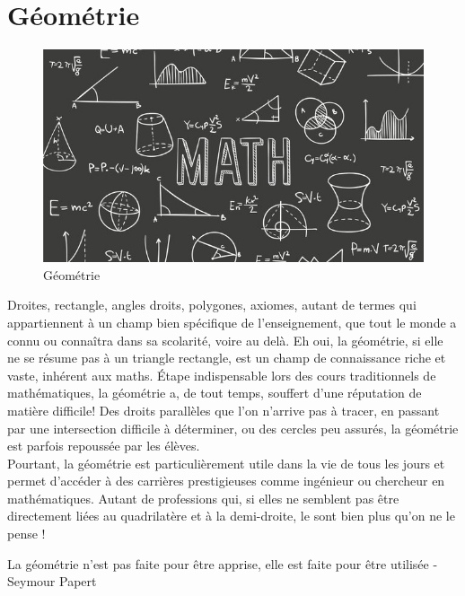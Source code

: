 \documentclass[a4paper]{report}
\begin{document}
\section{Géométrie}
\begin{figure}[!h]
    \centering
    \includegraphics{images/fond-maths.png}
    \caption{Géométrie}
    \label{fig:Géométrie}
\end{figure}
Droites, rectangle, angles droits, polygones, axiomes, autant de termes qui appartiennent à un champ bien spécifique de l'enseignement, que tout le monde a connu ou connaîtra dans sa scolarité, voire au delà. Eh oui, la géométrie, si elle ne se résume pas à un triangle rectangle, est un champ de connaissance riche et vaste, inhérent aux maths.
Étape indispensable lors des cours traditionnels de mathématiques, la géométrie a, de tout temps, souffert d'une réputation de matière difficile! Des droits parallèles que l'on n'arrive pas à tracer, en passant par une intersection difficile à déterminer, ou des cercles peu assurés, la géométrie est parfois repoussée par les élèves.\\
Pourtant, la géométrie est particulièrement utile dans la vie de tous les jours et permet d'accéder à des carrières prestigieuses comme ingénieur ou chercheur en mathématiques. Autant de professions qui, si elles ne semblent pas être directement liées au quadrilatère et à la demi-droite, le sont bien plus qu'on ne le pense !\\
\begin{center}
La géométrie n'est pas faite pour être apprise, elle est faite pour être utilisée - Seymour Papert
\end{center}
\end{document}
